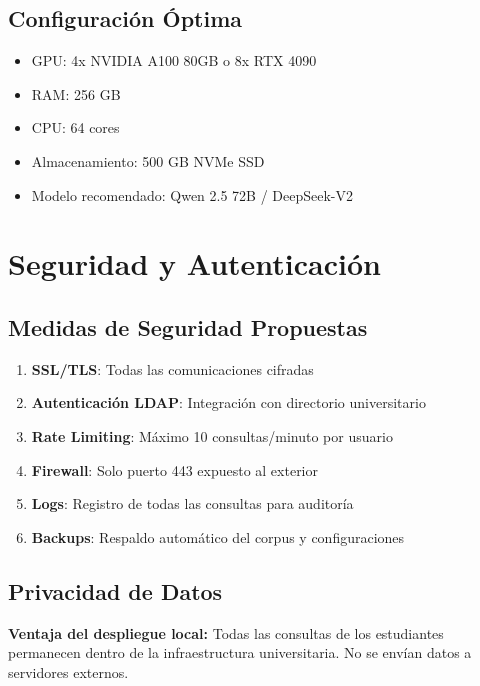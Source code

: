 \documentclass[12pt,letterpaper]{article}
\begin{document}
\subsection{Configuraci\'on \'Optima}
\begin{itemize}
    \item GPU: 4x NVIDIA A100 80GB o 8x RTX 4090
    \item RAM: 256 GB
    \item CPU: 64 cores
    \item Almacenamiento: 500 GB NVMe SSD
    \item Modelo recomendado: Qwen 2.5 72B / DeepSeek-V2
\end{itemize}

\section{Seguridad y Autenticaci\'on}

\subsection{Medidas de Seguridad Propuestas}

\begin{enumerate}
    \item \textbf{SSL/TLS}: Todas las comunicaciones cifradas
    \item \textbf{Autenticaci\'on LDAP}: Integraci\'on con directorio universitario
    \item \textbf{Rate Limiting}: M\'aximo 10 consultas/minuto por usuario
    \item \textbf{Firewall}: Solo puerto 443 expuesto al exterior
    \item \textbf{Logs}: Registro de todas las consultas para auditor\'ia
    \item \textbf{Backups}: Respaldo autom\'atico del corpus y configuraciones
\end{enumerate}

\subsection{Privacidad de Datos}

\begin{tcolorbox}[colback=secondary!10, colframe=secondary]
\textbf{Ventaja del despliegue local:} Todas las consultas de los estudiantes permanecen dentro de la infraestructura universitaria. No se env\'ian datos a servidores externos.
\end{tcolorbox}
\end{document}
